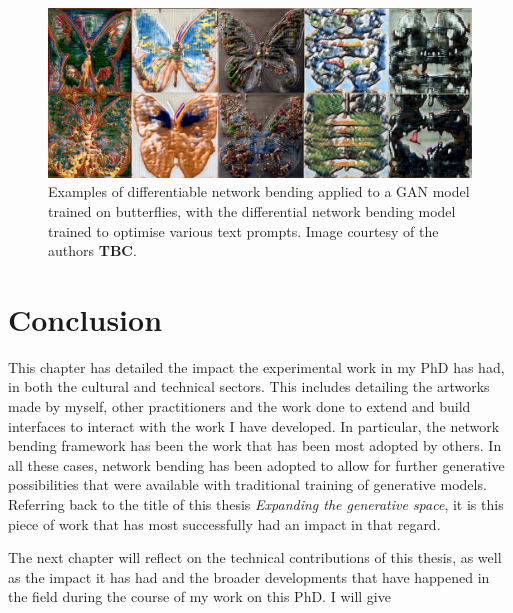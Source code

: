 \begin{figure}[!htb]
    \centering
    \captionsetup{justification=centering}
    \includegraphics[width=1\textwidth]{figures/c7_impact/net-bend-technical/diff-net-bend.png}
    \caption[Differential network bending]{Examples of differentiable network bending \citep{aldegheri2023hacking} applied to a GAN model trained on butterflies, with the differential network bending model trained to optimise various text prompts. Image courtesy of the authors \textbf{TBC}.}
    \label{fig:c7:differential-net-bend}
\end{figure}


\section{Conclusion}

This chapter has detailed the impact the experimental work in my PhD has had, in both the cultural and technical sectors. 
This includes detailing the artworks made by myself, other practitioners and the work done to extend and build interfaces to interact with the work I have developed. 
In particular, the network bending framework has been the work that has been most adopted by others. 
In all these cases, network bending has been adopted to allow for further generative possibilities that were available with traditional training of generative models. 
Referring back to the title of this thesis \textit{Expanding the generative space}, it is this piece of work that has most successfully had an impact in that regard. 

The next chapter will reflect on the technical contributions of this thesis, as well as the impact it has had and the broader developments that have happened in the field during the course of my work on this PhD.
I will give 